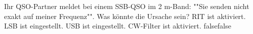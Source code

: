     {Ihr QSO-Partner meldet bei einem SSB-QSO im 2 m-Band: ""Sie senden nicht exakt auf meiner Frequenz"". Was könnte die Ursache sein?}
    {RIT ist aktiviert.}
    {LSB ist eingestellt.}
    {USB ist eingestellt.}
    {CW-Filter ist aktiviert.}
    {false}{false}
